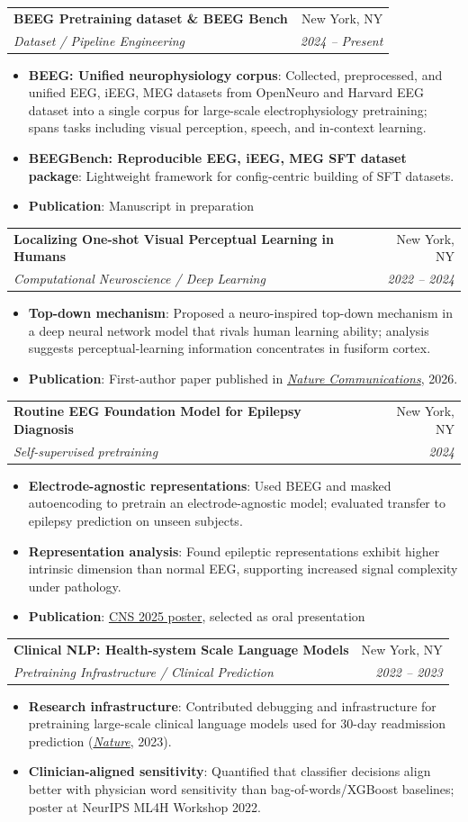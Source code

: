 \documentclass[letterpaper,11pt]{article}
\makeatletter
\newcommand{\resumeItem}[2]{
  \item\small{
    \textbf{#1}{: #2 \vspace{-2pt}}
  }
}
\newcommand{\resumeSubheading}[4]{
  \vspace{-1pt}\item
    \begin{tabular*}{0.97\textwidth}{l@{\extracolsep{\fill}}r}
      \textbf{#1} & #2 \\
      \textit{\small#3} & \textit{\small #4} \\
    \end{tabular*}\vspace{-5pt}
}
\newcommand{\resumeItemListStart}{\begin{itemize}}
\newcommand{\resumeItemListEnd}{\end{itemize}\vspace{-5pt}}
\makeatother
\begin{document}
    \resumeSubheading
      {BEEG Pretraining dataset \& BEEG Bench}{New York, NY}
      {Dataset / Pipeline Engineering}{2024 -- Present}
      \resumeItemListStart
        \resumeItem{BEEG: Unified neurophysiology corpus}
          {Collected, preprocessed, and unified EEG, iEEG, MEG datasets from OpenNeuro and Harvard EEG dataset into a single corpus for large-scale electrophysiology pretraining; spans tasks including visual perception, speech, and in-context learning.}
        \resumeItem{BEEGBench: Reproducible EEG, iEEG, MEG SFT dataset package}
          {Lightweight framework for config-centric building of SFT datasets.}
        \resumeItem{Publication}{Manuscript in preparation}
    \resumeItemListEnd

    \resumeSubheading
      {Localizing One-shot Visual Perceptual Learning in Humans}{New York, NY}
      {Computational Neuroscience / Deep Learning}{2022 -- 2024}
      \resumeItemListStart
        \resumeItem{Top-down mechanism}
          {Proposed a neuro-inspired top-down mechanism in a deep neural network model that rivals human learning ability; analysis suggests perceptual-learning information concentrates in fusiform cortex.}
        \resumeItem{Publication}
          {First-author paper published in \href{https://doi.org/10.1038/s41467-026-68711-x}{\textit{Nature Communications}}, 2026.}
      \resumeItemListEnd

    \resumeSubheading
      {Routine EEG Foundation Model for Epilepsy Diagnosis}{New York, NY}
      {Self-supervised pretraining}{2024}
      \resumeItemListStart
        \resumeItem{Electrode-agnostic representations}
          {Used BEEG and masked autoencoding to pretrain an electrode-agnostic model; evaluated transfer to epilepsy prediction on unseen subjects.}
        \resumeItem{Representation analysis}
          {Found epileptic representations exhibit higher intrinsic dimension than normal EEG, supporting increased signal complexity under pathology.}
\resumeItem{Publication}{\href{https://www.cns.org/poster-search?id=53025}{CNS 2025 poster}, selected as oral presentation}
      \resumeItemListEnd

    \resumeSubheading
      {Clinical NLP: Health-system Scale Language Models}{New York, NY}
      {Pretraining Infrastructure / Clinical Prediction}{2022 -- 2023}
      \resumeItemListStart
        \resumeItem{Research infrastructure}
          {Contributed debugging and infrastructure for pretraining large-scale clinical language models used for 30-day readmission prediction (\href{https://www.nature.com/articles/s41586-023-06160-y}{\textit{Nature}}, 2023).}
        \resumeItem{Clinician-aligned sensitivity}
          {Quantified that classifier decisions align better with physician word sensitivity than bag-of-words/XGBoost baselines; poster at NeurIPS ML4H Workshop 2022.}
      \resumeItemListEnd
\end{document}
